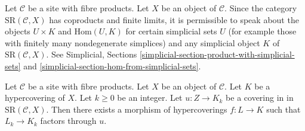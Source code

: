 \noindent
Let $\mathcal{C}$ be a site with fibre products.
Let $X$ be an object of $\mathcal{C}$.
Since the category $\text{SR}(\mathcal{C}, X)$ has coproducts and
finite limits, it is permissible to speak about the objects
$U \times K$ and $\text{Hom}(U, K)$ for certain simplicial sets $U$
(for example those with finitely many nondegenerate simplices)
and any simplicial object $K$ of $\text{SR}(\mathcal{C}, X)$.
See Simplicial, Sections
\ref{simplicial-section-product-with-simplicial-sets} and
\ref{simplicial-section-hom-from-simplicial-sets}.

\begin{lemma}
\label{lemma-covering}
Let $\mathcal{C}$ be a site with fibre products.
Let $X$ be an object of $\mathcal{C}$.
Let $K$ be a hypercovering of $X$.
Let $k \geq 0$ be an integer.
Let $u : Z \to K_k$ be a covering in
in $\text{SR}(\mathcal{C}, X)$.
Then there exists a morphism of hypercoverings
$f: L \to K$ such that $L_k \to K_k$
factors through $u$.
\end{lemma}

